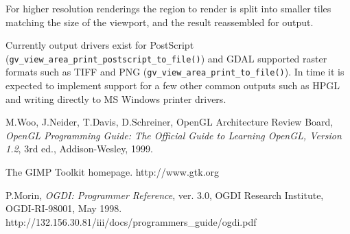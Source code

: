 \documentclass{openevreport}
\begin{document}
For higher resolution renderings the region to render is split into smaller 
tiles matching the size of the viewport, and the result reassembled for
output.  

Currently output drivers exist for PostScript 
({\tt gv\_view\_area\_print\_postscript\_to\_file()}) and GDAL supported raster 
formats such as TIFF and PNG 
({\tt gv\_view\_area\_print\_to\_file()}).  In time it is expected to implement
support for a few other common outputs such as HPGL and writing directly to
MS Windows printer drivers. 


\begin{thebibliography}{9}

 M.Woo, J.Neider, T.Davis, D.Schreiner, OpenGL
Architecture Review Board, \emph{OpenGL Programming Guide: The
Official Guide to Learning OpenGL, Version 1.2}, 3rd ed.,
Addison-Wesley, 1999.

 The GIMP Toolkit homepage.  http://www.gtk.org

 P.Morin, \emph{OGDI: Programmer Reference},
ver. 3.0, OGDI Research Institute, OGDI-RI-98001, May 1998.\\
http://132.156.30.81/iii/docs/programmers\_guide/ogdi.pdf

\end{thebibliography}
\end{document}
